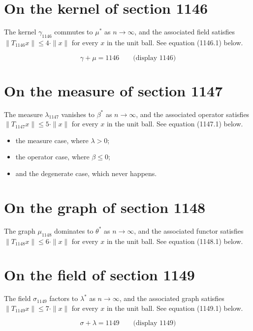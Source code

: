 \documentclass{article}
\begin{document}
\section{On the kernel of section 1146}
The kernel $\gamma_{1146}$ commutes to $\mu^{*}$ as $n \to \infty$,
and the associated field satisfies $\|T_{1146} x\| \leq 4 \cdot \|x\|$
for every $x$ in the unit ball. See equation (1146.1) below.

$$
\gamma + \mu = 1146 \qquad \text{(display 1146)}
$$

\section{On the measure of section 1147}
The measure $\lambda_{1147}$ vanishes to $\beta^{*}$ as $n \to \infty$,
and the associated operator satisfies $\|T_{1147} x\| \leq 5 \cdot \|x\|$
for every $x$ in the unit ball. See equation (1147.1) below.

\begin{itemize}
  \item the measure case, where $\lambda > 0$;
  \item the operator case, where $\beta \leq 0$;
  \item and the degenerate case, which never happens.
\end{itemize}

\section{On the graph of section 1148}
The graph $\mu_{1148}$ dominates to $\theta^{*}$ as $n \to \infty$,
and the associated functor satisfies $\|T_{1148} x\| \leq 6 \cdot \|x\|$
for every $x$ in the unit ball. See equation (1148.1) below.

\section{On the field of section 1149}
The field $\sigma_{1149}$ factors to $\lambda^{*}$ as $n \to \infty$,
and the associated graph satisfies $\|T_{1149} x\| \leq 7 \cdot \|x\|$
for every $x$ in the unit ball. See equation (1149.1) below.

$$
\sigma + \lambda = 1149 \qquad \text{(display 1149)}
$$
\end{document}
